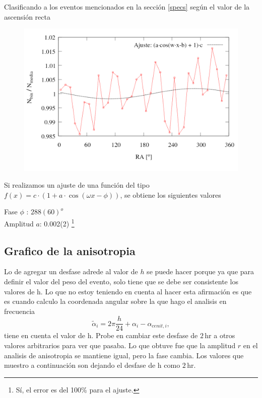Clasificando a los eventos mencionados en la sección \ref{specs} según el valor de la ascensión recta
\begin{figure}[H]
	\centering
	\includegraphics[width=\linewidth]{bineado_eventos_herald_por_RA.png}
	\caption{}
\end{figure}

Si realizamos un ajuste de una función del tipo $f(x) = c\cdot(1 + a\cdot\cos{(\omega x - \phi)})$, se obtiene los siguientes valores
		
	Fase $\phi$ : $288(60)^o$  \\
	Amplitud $a$: 0.002(2) \footnote{Sí, el error es del 100\% para el ajuste.}  	 \\
		



\subsection{Grafico de la anisotropia}


		Lo de agregar un desfase adrede al valor de $h$ se puede hacer porque ya que para definir el valor del peso del evento, solo tiene que se debe ser consistente los valores  de h. Lo que no estoy teniendo en cuenta al hacer esta afirmación es que es cuando calculo la coordenada angular sobre la que hago el analisis en frecuencia
		\begin{equation}
			   \tilde{\alpha}_i = 2\pi \frac{h}{24} + \alpha_i -\alpha_{cenit,i},
		\end{equation}
		tiene en cuenta el valor de h. Probe en cambiar este desfase de $2\,$hr a otros valores arbitrarios para ver que pasaba. Lo que obtuve fue que la amplitud $r$ en el analisis de anisotropia se mantiene igual, pero la fase cambia. Los valores que muestro a continuación son dejando el desfase de h como $2\,$hr.
		
